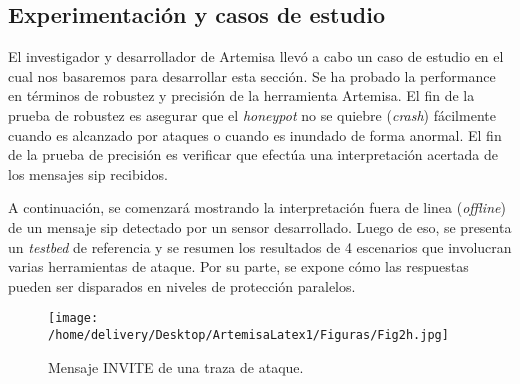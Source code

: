 \documentclass[a4paper,12pt]{report}
\begin{document}
\newpage
                                                                 
\subsection{Experimentación y casos de estudio}   
\label{exp_casos_estudio_arte}
                     
El investigador y desarrollador de Artemisa \cite{docarmof} llevó a cabo un caso de estudio en el cual nos basaremos
para desarrollar esta sección. Se ha probado la performance en términos de robustez y precisión de la
herramienta Artemisa. El fin de la prueba de robustez es asegurar que el
\emph{honeypot} no se quiebre (\emph{crash}) fácilmente cuando es alcanzado por ataques
o cuando es inundado de forma anormal. El fin de la prueba de precisión es
verificar que efectúa una interpretación acertada de los mensajes \ac{sip}
recibidos. 

A continuación, se comenzará mostrando la interpretación fuera de linea
(\emph{offline}) de un mensaje \ac{sip} detectado por un sensor desarrollado. Luego
de eso, se presenta un \emph{testbed} de referencia y se resumen los resultados de 4
escenarios que involucran varias herramientas de ataque. Por su parte, se expone
cómo las respuestas pueden ser disparados en niveles de protección paralelos. 

\begin{figure}[h!] 
\centering
\texttt{[image: /home/delivery/Desktop/ArtemisaLatex1/Figuras/Fig2h.jpg]}
\caption{Mensaje INVITE de una traza de ataque. \cite{docarmof}}
\label{mje_invite_ataque}
\end{figure}
                        
\end{document}
